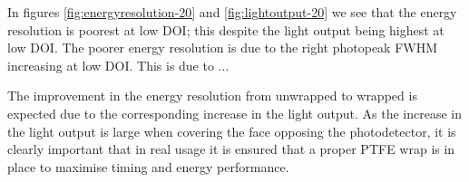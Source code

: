 In figures \ref{fig:energyresolution-20} and \ref{fig:lightoutput-20} we see that the energy resolution is poorest at low DOI; this despite the light output being highest at low DOI. The poorer energy resolution is due to the right photopeak FWHM increasing at low DOI. This is due to ...

The improvement in the energy resolution from unwrapped to wrapped is expected due to the corresponding increase in the light output. As the increase in the light output is large when covering the face opposing the photodetector, it is clearly important that in real usage it is ensured that a proper PTFE wrap is in place to maximise timing and energy performance.